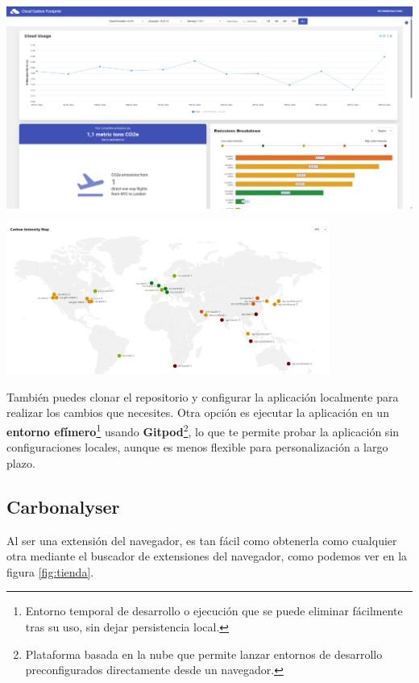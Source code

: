 \documentclass[12pt,a4paper]{report}
\begin{document}
\begin{center}
  \includegraphics[width=1\textwidth]{imagenes/CCF_1.png}
  \label{fig:frontccf}
\end{center}

\begin{center}
  \includegraphics[width=0.8\textwidth]{imagenes/CCF_2.png}
  \label{fig:mapaccf}
\end{center}

También puedes clonar el repositorio y configurar la aplicación localmente para
realizar los cambios que necesites. Otra opción es ejecutar la aplicación en un
\textbf{entorno efímero}\footnote{Entorno temporal de desarrollo o ejecución
  que se puede eliminar fácilmente tras su uso, sin dejar persistencia local.}
usando \textbf{Gitpod}\footnote{Plataforma basada en la nube que permite lanzar
  entornos de desarrollo preconfigurados directamente desde un navegador.}, lo
que te permite probar la aplicación sin configuraciones locales, aunque es
menos flexible para personalización a largo plazo.

\subsection{Carbonalyser}
Al ser una extensión del navegador, es tan fácil como obtenerla como cualquier
otra mediante el buscador de extensiones del navegador, como podemos ver en la figura \ref{fig:tienda}.
\end{document}
